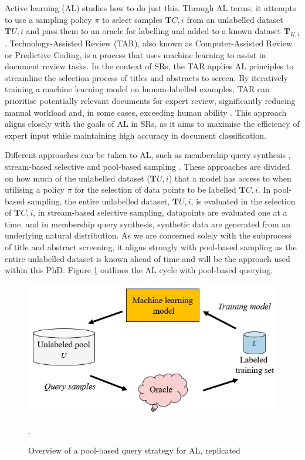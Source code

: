\documentclass[../main.tex]{subfiles}
\begin{document}
Active learning (AL) studies how to do just this. Through AL terms, it attempts to use a sampling policy $\pi$ to select samples $\mathbf{T}{C,i}$ from an unlabelled dataset $\mathbf{T}{U,i}$ and pass them to an oracle for labelling and added to a known dataset $\mathbf{T}_{K,i}$. Technology-Assisted Review (TAR), also known as Computer-Assisted Review or Predictive Coding, is a process that uses machine learning to assist in document review tasks. In the context of SRs, the TAR applies AL principles to streamline the selection process of titles and abstracts to screen. By iteratively training a machine learning model on human-labelled examples, TAR can prioritise potentially relevant documents for expert review, significantly reducing manual workload and, in some cases, exceeding human ability \cite{grossman_technology-assisted_2010}. This approach aligns closely with the goals of AL in SRs, as it aims to maximise the efficiency of expert input while maintaining high accuracy in document classification. 

Different approaches can be taken to AL, such as membership query synthesis \cite{angluin_queries_1988}, stream-based selective \cite{akinseloyin_novel_2024} and pool-based sampling \cite{lewis_sequential_1994}. These approaches are divided on how much of the unlabelled dataset ($\mathbf{T}{U, i}$) that a model has access to when utilising a policy $\pi$ for the selection of data points to be labelled $\mathbf{T}{C,i}$. In pool-based sampling, the entire unlabelled dataset, $\mathbf{T}{U,i}$, is evaluated in the selection of $\mathbf{T}{C,i}$, in stream-based selective sampling, datapoints are evaluated one at a time, and in membership query synthesis, synthetic data are generated from an underlying natural distribution. As we are concerned solely with the subprocess of title and abstract screening, it aligns strongly with pool-based sampling as the entire unlabelled dataset is known ahead of time and will be the approach used within this PhD. Figure \ref{fig:pool_based_query} outlines the AL cycle with pool-based querying.

\begin{figure}
\centering
\includegraphics[width=0.5\linewidth]{sections//images/pool_based_strategy.png}
\caption{Overview of a pool-based query strategy for AL, replicated\cite{ren_survey_2021}}.
\label{fig:pool_based_query}
\end{figure}
\end{document}
